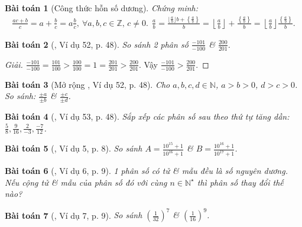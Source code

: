 \documentclass{article}
\newtheorem{baitoan}{Bài toán}
\begin{document}
\begin{baitoan}[Công thức hỗn số dương]
	Chứng minh:
	\begin{align*}
		\frac{ac + b}{c} = a + \frac{b}{c} = a\frac{b}{c},\ \forall a,b,c\in\mathbb{Z},\,c\ne0.\ \ \frac{a}{b} = \frac{\lfloor\frac{a}{b}\rfloor b + \left\{\frac{a}{b}\right\}}{b} = \left\lfloor\frac{a}{b}\right\rfloor + \frac{\left\{\frac{a}{b}\right\}}{b} = \left\lfloor\frac{a}{b}\right\rfloor\frac{\left\{\frac{a}{b}\right\}}{b}.
	\end{align*}
\end{baitoan}

\begin{baitoan}[\cite{Tuyen_Toan_6}, Ví dụ 52, p. 48]
	So sánh 2 phân số $\frac{-101}{-100}$ \& $\frac{200}{201}$.
\end{baitoan}

\begin{proof}[Giải]
	$\frac{-101}{-100} = \frac{101}{100} > \frac{100}{100} = 1 = \frac{201}{201} > \frac{200}{201}$. Vậy $\frac{-101}{-100} > \frac{200}{201}$.
\end{proof}

\begin{baitoan}[Mở rộng \cite{Tuyen_Toan_6}, Ví dụ 52, p. 48]
	Cho $a,b,c,d\in\mathbb{N}$, $a > b > 0$, $d > c > 0$. So sánh: $\frac{\pm a}{\pm b}$ \& $\frac{\pm c}{\pm d}$.
\end{baitoan}

\begin{baitoan}[\cite{Tuyen_Toan_6}, Ví dụ 53, p. 48]
	Sắp xếp các phân số sau theo thứ tự tăng dần: $\frac{5}{8},\frac{9}{16},\frac{2}{-3},\frac{-7}{12}$.
\end{baitoan}

\begin{baitoan}[\cite{Binh_Toan_6_tap_2}, Ví dụ 5, p. 8]
	So sánh $A = \frac{10^{15} + 1}{10^{16} + 1}$ \& $B = \frac{10^{16} + 1}{10^{17} + 1}$.
\end{baitoan}

\begin{baitoan}[\cite{Binh_Toan_6_tap_2}, Ví dụ 6, p. 9]
	1 phân số có tử \& mẫu đều là số nguyên dương. Nếu cộng tử \& mẫu của phân số đó với cùng $n\in\mathbb{N}^\star$ thì phân số thay đổi thế nào?
\end{baitoan}

\begin{baitoan}[\cite{Binh_Toan_6_tap_2}, Ví dụ 7, p. 9]
	So sánh $\left(\frac{1}{32}\right)^7$ \& $\left(\frac{1}{16}\right)^9$.
\end{baitoan}
\end{document}

